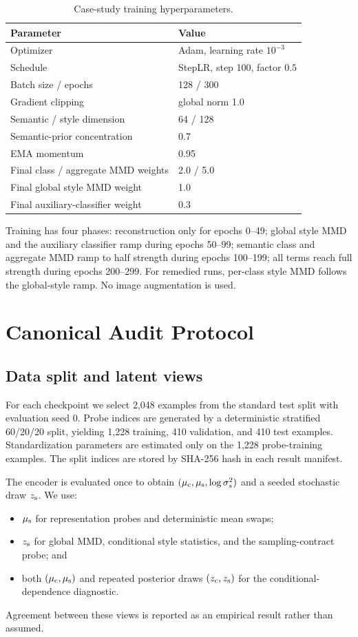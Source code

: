 \begin{table}[ht]
\caption{Case-study training hyperparameters.}
\label{tab:hyperparameters}
\centering
\small
\begin{tabular}{ll}
\toprule
Parameter & Value \\
\midrule
Optimizer & Adam, learning rate $10^{-3}$ \\
Schedule & StepLR, step 100, factor $0.5$ \\
Batch size / epochs & 128 / 300 \\
Gradient clipping & global norm 1.0 \\
Semantic / style dimension & 64 / 128 \\
Semantic-prior concentration & 0.7 \\
EMA momentum & 0.95 \\
Final class / aggregate MMD weights & 2.0 / 5.0 \\
Final global style MMD weight & 1.0 \\
Final auxiliary-classifier weight & 0.3 \\
\bottomrule
\end{tabular}
\end{table}

Training has four phases: reconstruction only for epochs 0--49; global style
MMD and the auxiliary classifier ramp during epochs 50--99; semantic class
and aggregate MMD ramp to half strength during epochs 100--199; all terms
reach full strength during epochs 200--299.  For remedied runs, per-class
style MMD follows the global-style ramp.  No image augmentation is used.

\section{Canonical Audit Protocol}
\label{app:protocol}

\subsection{Data split and latent views}

For each checkpoint we select 2,048 examples from the standard test split
with evaluation seed 0.  Probe indices are generated by a deterministic
stratified 60/20/20 split, yielding 1,228 training, 410 validation, and 410
test examples.  Standardization parameters are estimated only on the 1,228
probe-training examples.  The split indices are stored by SHA-256 hash in
each result manifest.

The encoder is evaluated once to obtain $(\mu_{\mathrm{c}},\mu_{\mathrm{s}},\log\sigma_s^2)$ and a
seeded stochastic draw $z_{\mathrm{s}}$.  We use:
\begin{itemize}
    \item $\mu_{\mathrm{s}}$ for representation probes and deterministic mean swaps;
    \item $z_{\mathrm{s}}$ for global MMD, conditional style statistics, and the
    sampling-contract probe; and
    \item both $(\mu_{\mathrm{c}},\mu_{\mathrm{s}})$ and repeated posterior draws $(z_{\mathrm{c}},z_{\mathrm{s}})$ for
    the conditional-dependence diagnostic.
\end{itemize}
Agreement between these views is reported as an empirical result rather than
assumed.

